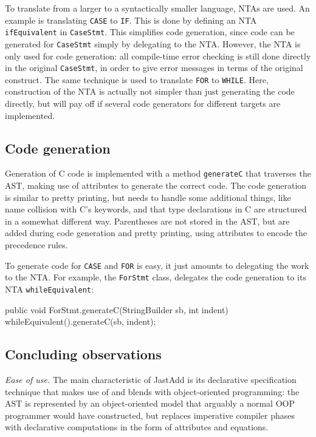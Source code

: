 To translate from a larger to a syntactically smaller language, NTAs are used. An example is translating \texttt{CASE} to \texttt{IF}.
This is done by defining an NTA \texttt{ifEquivalent} in \texttt{CaseStmt}. This simplifies code generation, since code can be generated for \texttt{CaseStmt} simply by delegating to the NTA. However, the NTA is only used for code generation: all compile-time error checking is still done directly in the original \texttt{CaseStmt}, in order to give error messages in terms of the original construct. The same technique is used to translate \texttt{FOR} to \texttt{WHILE}. Here, construction of the NTA is actually not simpler than just generating the code directly, but will pay off if several code generators for different targets are implemented.

%
%
\subsection{Code generation}
Generation of C code is implemented with a method \texttt{generateC}
that traverses the AST, making use of attributes to generate the correct code.
The code generation is similar to pretty printing, but needs to handle some additional things, like name collision with C's keywords, and that type declarations in C are structured in a somewhat different way. Parentheses are not stored in the AST, but are added during code generation and pretty printing, using attributes to encode the precedence rules.

To generate code for \texttt{CASE} and \texttt{FOR} is easy, it just amounts to delegating the work to the NTA. For example, the \texttt{ForStmt} class, delegates the code generation to its NTA \texttt{whileEquivalent}: 

\begin{jastaddcode}
public void ForStmt.generateC(StringBuilder sb, int indent) {
	whileEquivalent().generateC(sb, indent);
}
\end{jastaddcode}


%
%
\subsection{Concluding observations}
\emph{Ease of use.} 
The main characteristic of JastAdd is its declarative specification technique that makes use of and blends with object-oriented programming: the AST is represented by an object-oriented model that arguably a normal OOP programmer would have constructed, but replaces imperative compiler phases with declarative computations in the form of attributes and equations.

